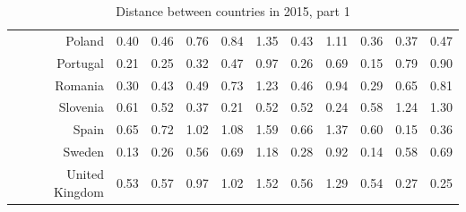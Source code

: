 \documentclass[a4paper,twoside,10pt]{article}
\begin{document}
\begin{table}[ht]
\begin{tabular}{r|rrrrrrrrrr}
			Poland & 0.40 & 0.46 & 0.76 & 0.84 & 1.35 & 0.43 & 1.11 & 0.36 & 0.37 & 0.47 \\
			Portugal & 0.21 & 0.25 & 0.32 & 0.47 & 0.97 & 0.26 & 0.69 & 0.15 & 0.79 & 0.90 \\
			Romania & 0.30 & 0.43 & 0.49 & 0.73 & 1.23 & 0.46 & 0.94 & 0.29 & 0.65 & 0.81 \\
			Slovenia & 0.61 & 0.52 & 0.37 & 0.21 & 0.52 & 0.52 & 0.24 & 0.58 & 1.24 & 1.30 \\
			Spain & 0.65 & 0.72 & 1.02 & 1.08 & 1.59 & 0.66 & 1.37 & 0.60 & 0.15 & 0.36 \\
			Sweden & 0.13 & 0.26 & 0.56 & 0.69 & 1.18 & 0.28 & 0.92 & 0.14 & 0.58 & 0.69 \\
			United Kingdom & 0.53 & 0.57 & 0.97 & 1.02 & 1.52 & 0.56 & 1.29 & 0.54 & 0.27 & 0.25 \\
			\hline
		\end{tabular}
		\caption{Distance between countries in 2015, part 1}

	\end{table}
	
\end{document}

